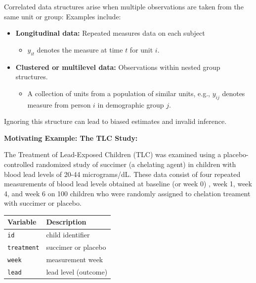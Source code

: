 \documentclass[
  letterpaper,
  DIV=11,
  numbers=noendperiod]{scrreprt}
\providecommand{\tightlist}{%
  \setlength{\itemsep}{0pt}\setlength{\parskip}{0pt}}\usepackage{longtable,booktabs,array}
\begin{document}
\begin{tcolorbox}[enhanced jigsaw, breakable, colbacktitle=quarto-callout-important-color!10!white, left=2mm, colframe=quarto-callout-important-color-frame, opacityback=0, coltitle=black, colback=white, rightrule=.15mm, title=\textcolor{quarto-callout-important-color}{\faExclamation}\hspace{0.5em}{Motivation:}, titlerule=0mm, opacitybacktitle=0.6, leftrule=.75mm, toprule=.15mm, arc=.35mm, bottomtitle=1mm, toptitle=1mm, bottomrule=.15mm]

Correlated data structures arise when multiple observations are taken
from the same unit or group: Examples include:

\begin{itemize}
\tightlist
\item
  \textbf{Longitudinal data:} Repeated measures data on each subject

  \begin{itemize}
  \tightlist
  \item
    \(y_{it}\) denotes the measure at time \(t\) for unit \(i\).
  \end{itemize}
\item
  \textbf{Clustered or multilevel data:} Observations within nested
  group structures.

  \begin{itemize}
  \tightlist
  \item
    A collection of units from a population of similar units, e.g.,
    \(y_{ij}\) denotes measure from person \(i\) in demographic group
    \(j\).
  \end{itemize}
\end{itemize}

Ignoring this structure can lead to biased estimates and invalid
inference.

\end{tcolorbox}

\textbf{Motivating Example: The TLC Study:}

The Treatment of Lead-Exposed Children (TLC) was examined using a
placebo-controlled randomized study of succimer (a chelating agent) in
children with blood lead levels of 20-44 micrograms/dL. These data
consist of four repeated measurements of blood lead levels obtained at
baseline (or week 0) , week 1, week 4, and week 6 on 100 children who
were randomly assigned to chelation treament with succimer or placebo.

\begin{longtable}[]{@{}ll@{}}
\toprule\noalign{}
Variable & Description \\
\midrule\noalign{}
\endhead
\bottomrule\noalign{}
\endlastfoot
\texttt{id} & child identifier \\
\texttt{treatment} & succimer or placebo \\
\texttt{week} & measurement week \\
\texttt{lead} & lead level (outcome) \\
\end{longtable}
\end{document}
